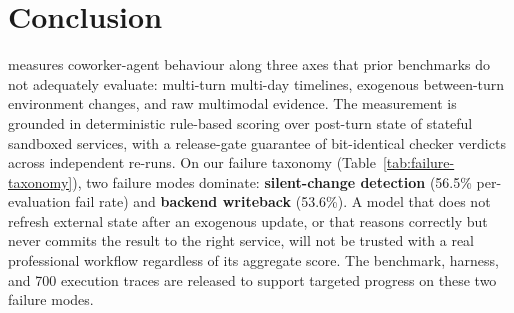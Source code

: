 
\section{Conclusion}
\label{sec:conclusion}

\bench{} measures coworker-agent behaviour along three axes that prior benchmarks do not adequately evaluate: multi-turn multi-day timelines, exogenous between-turn environment changes, and raw multimodal evidence. The measurement is grounded in deterministic rule-based scoring over post-turn state of stateful sandboxed services, with a release-gate guarantee of bit-identical checker verdicts across independent re-runs. On our failure taxonomy (Table~\ref{tab:failure-taxonomy}), two failure modes dominate: \textbf{silent-change detection} (56.5\% per-evaluation fail rate) and \textbf{backend writeback} (53.6\%). A model that does not refresh external state after an exogenous update, or that reasons correctly but never commits the result to the right service, will not be trusted with a real professional workflow regardless of its aggregate score. The benchmark, harness, and 700 execution traces are released to support targeted progress on these two failure modes.
